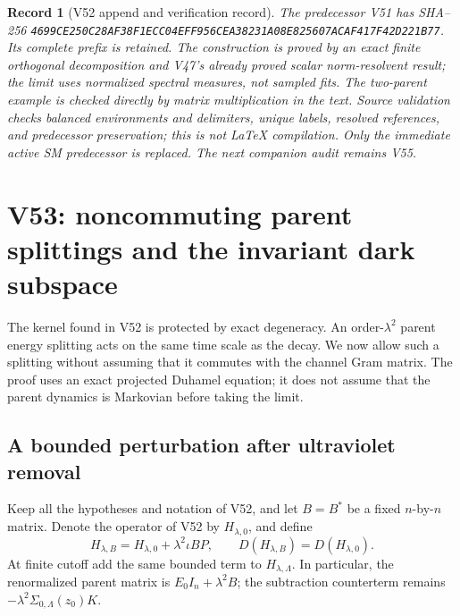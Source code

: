 \documentclass[11pt]{article}
\newtheorem{record}[theorem]{Record}
\theoremstyle{remark}
\begin{document}
\begin{record}[V52 append and verification record]
\label{rec:v20v52}
The predecessor V51 has SHA--256
\texttt{4699CE250C28AF38F1ECC04EFF956CEA38231A08E825607ACAF417F42D221B77}.
Its complete prefix is retained.  The construction is proved by
an exact finite orthogonal decomposition and V47's already proved
scalar norm-resolvent result; the limit uses normalized spectral
measures, not sampled fits.  The two-parent example is checked
directly by matrix multiplication in the text.  Source validation
checks balanced environments and delimiters, unique labels,
resolved references, and predecessor preservation; this is not
LaTeX compilation.  Only the immediate active SM predecessor is
replaced.  The next companion audit remains V55.
\end{record}


\section{V53: noncommuting parent splittings and the invariant dark subspace}
\label{sec:v20v53}

The kernel found in V52 is protected by exact degeneracy.
An order-\(\lambda^2\) parent energy splitting acts on the same
time scale as the decay.  We now allow such a splitting without
assuming that it commutes with the channel Gram matrix.
The proof uses an exact projected Duhamel equation; it does not
assume that the parent dynamics is Markovian before taking the limit.

\subsection{A bounded perturbation after ultraviolet removal}

Keep all the hypotheses and notation of V52, and let
\(B=B^*\) be a fixed \(n\)-by-\(n\) matrix.  Denote the operator
of V52 by \(H_{\lambda,0}\), and define
\[
 H_{\lambda,B}=H_{\lambda,0}+\lambda^2\iota BP,\qquad
 D(H_{\lambda,B})=D(H_{\lambda,0}).
\]
At finite cutoff add the same bounded term to
\(H_{\lambda,\Lambda}\).  In particular, the renormalized parent
matrix is \(E_0I_n+\lambda^2B\); the subtraction counterterm
remains \(-\lambda^2\Sigma_{0,\Lambda}(z_0)K\).
\end{document}
